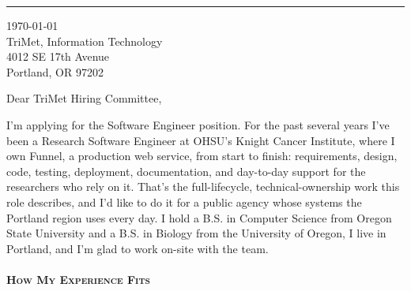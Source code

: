 
\newcommand{\docfontsize}{10pt}



{\color{my-grey-light}\rule{\linewidth}{0.5pt}}
\bigbreak

{\today}\\
TriMet, Information Technology\\
4012 SE 17th Avenue\\
Portland, OR 97202

\vspace*{0.6\baselineskip}

Dear TriMet Hiring Committee,

\vspace*{0.3\baselineskip}

I'm applying for the Software Engineer position. For the past several years I've been a Research Software Engineer at OHSU's Knight Cancer Institute, where I own Funnel, a production web service, from start to finish: requirements, design, code, testing, deployment, documentation, and day-to-day support for the researchers who rely on it. That's the full-lifecycle, technical-ownership work this role describes, and I'd like to do it for a public agency whose systems the Portland region uses every day. I hold a B.S. in Computer Science from Oregon State University and a B.S. in Biology from the University of Oregon, I live in Portland, and I'm glad to work on-site with the team.

\paragraph{\textbf{\scshape How My Experience Fits}}\

\vspace*{0.3\baselineskip}


